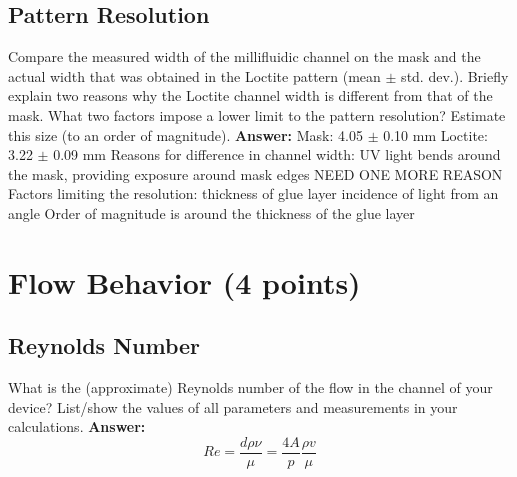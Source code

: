 \documentclass[12pt]{article}%
\begin{document}
\subsection{Pattern Resolution} Compare the measured width of the millifluidic channel on the mask and the actual width that was obtained in the Loctite pattern (mean $\pm$ std. dev.). Briefly explain two reasons why the Loctite channel width is different from that of the mask. What two factors impose a lower limit to the pattern resolution? Estimate this size (to an order of magnitude).
\newline
\newline
\textbf{Answer:}
\newline
\newline
[0.5] Mask: 4.05 $\pm$ 0.10 mm
\newline
[0.5] Loctite: 3.22 $\pm$ 0.09 mm
\newline
\newline
Reasons for difference in channel width:
\newline
[0.5] UV light bends around the mask, providing exposure around mask edges
\newline
[0.5] NEED ONE MORE REASON
\newline
\newline
Factors limiting the resolution:
\newline
[0.5] thickness of glue layer
\newline
[0.5] incidence of light from an angle
\newline
\newline
[1] Order of magnitude is around the thickness of the glue layer

\section{Flow Behavior (4 points)}
\subsection{Reynolds Number} What is the (approximate) Reynolds number of the flow in the channel of your device? List/show the values of all parameters and measurements in your calculations. 
\newline
\newline
\textbf{Answer:}
\newline
\begin{equation}
Re = \frac{d \rho \nu}{\mu} = \frac{4A}{p} \frac{\rho v}{\mu}
\end{equation}
\end{document}
